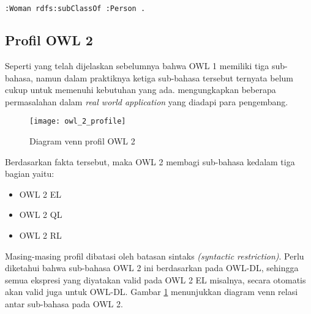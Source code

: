 \begin{lstlisting}[language=XML, caption=contoh sintak turtle, xleftmargin=0pt]
	:Woman rdfs:subClassOf :Person .
\end{lstlisting}

\subsection{Profil OWL 2}
Seperti yang telah dijelaskan sebelumnya bahwa OWL 1 memiliki tiga sub-bahasa, namun dalam praktiknya ketiga sub-bahasa tersebut ternyata belum cukup untuk memenuhi kebutuhan yang ada. \citet{patel} mengungkapkan beberapa permasalahan dalam \emph{real world application} yang diadapi para pengembang.

\begin{figure}[hb]
	\centering
	\texttt{[image: owl\_2\_profile]}
	\caption{Diagram venn profil OWL 2}
	\label{fig:owl_2_profile}
\end{figure}

Berdasarkan fakta tersebut, maka OWL 2 membagi sub-bahasa kedalam tiga bagian yaitu:
\begin{itemize}
	\item OWL 2 EL
	\item OWL 2 QL
	\item OWL 2 RL
\end{itemize}

Masing-masing profil dibatasi oleh batasan sintaks \emph{(syntactic restriction)}. Perlu diketahui bahwa sub-bahasa OWL 2 ini berdasarkan pada OWL-DL, sehingga semua ekspresi yang diyatakan valid pada OWL 2 EL misalnya, secara otomatis akan valid juga untuk OWL-DL. Gambar \ref{fig:owl_2_profile} menunjukkan diagram venn relasi antar sub-bahasa pada OWL 2.